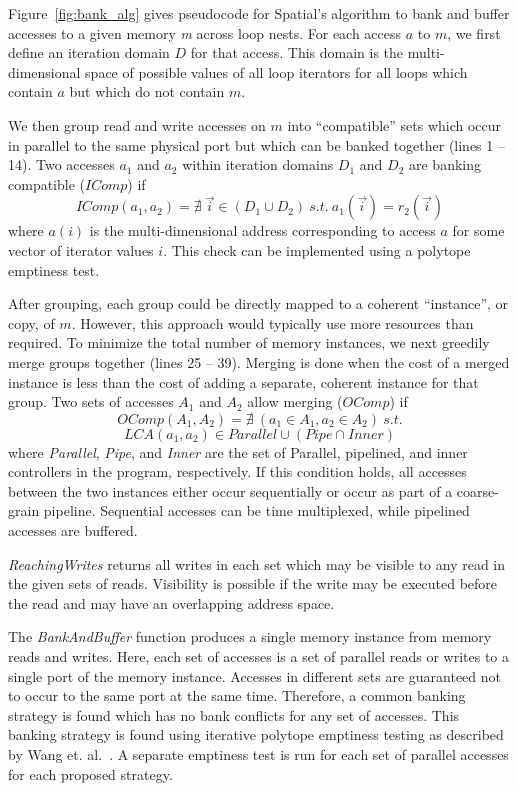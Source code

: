 Figure~\ref{fig:bank_alg} gives pseudocode for Spatial's algorithm to bank and buffer accesses to a given memory \emph{m} across loop nests. For each access $a$ to $m$, we first define an iteration domain $D$ for that access. This domain is the multi-dimensional space of possible values of all loop iterators for all loops which contain $a$ but which do not contain $m$. 

We then group read and write accesses on $m$ into ``compatible'' sets which occur in parallel to the same physical port but which can be banked together (lines 1 -- 14). 
Two accesses $a_1$ and $a_2$ within iteration domains $D_1$ and $D_2$
are banking compatible ($IComp$) if
\[ IComp(a_1,a_2) = \nexists~\vec{i} \in (D_1 \cup D_2) ~s.t.~a_1(\vec{i}) = r_2(\vec{i}) \]
where $a(i)$ is the multi-dimensional address corresponding to access $a$ for some vector of iterator values $i$.
This check can be implemented using a polytope emptiness test.

After grouping, each group could be directly mapped to a coherent ``instance'', or copy, of $m$. 
However, this approach would typically use more resources than required. To minimize the total number of memory instances, we next greedily merge groups together (lines 25 -- 39). Merging is done when the cost of a merged instance is less than the cost of adding a separate, coherent instance for that group.
Two sets of accesses $A_1$ and $A_2$ allow merging ($OComp$) if 
\[ OComp(A_1, A_2) = \nexists~ (a_1 \in A_1, a_2 \in A_2) ~s.t. \]
\[  LCA(a_1, a_2) \in Parallel \cup (Pipe \cap Inner) \]
where \emph{Parallel}, \emph{Pipe}, and \emph{Inner} are the set of Parallel, pipelined, and inner controllers in the program, respectively.
If this condition holds, all accesses between the two instances either occur sequentially or occur as part of a coarse-grain pipeline. Sequential accesses can be time multiplexed, while pipelined accesses are buffered.

\emph{ReachingWrites} returns all writes in each set which may be visible to any read in the given sets of reads. Visibility is possible if the write may be executed before the read and may have an overlapping address space.

The \emph{BankAndBuffer} function produces a single memory instance from memory reads and writes.
Here, each set of accesses is a set of parallel reads or writes to a single port of the memory instance.
Accesses in different sets are guaranteed not to occur to the same port at the same time.
Therefore, a common banking strategy is found which has no bank conflicts for any set of accesses. 
This banking strategy is found using iterative polytope emptiness testing as described by Wang et. al.~\cite{Wang_banking}. 
A separate emptiness test is run for each set of parallel accesses for each proposed strategy.

